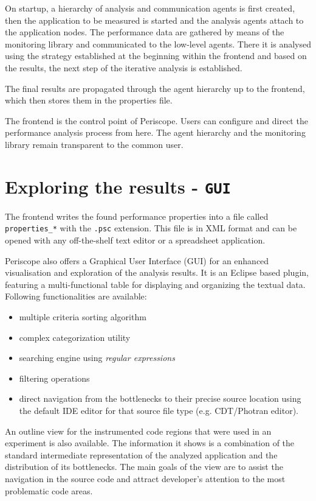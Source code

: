 \documentclass[11pt,oneside,a4paper]{book}
\begin{document}
On startup, a hierarchy of analysis and communication agents is first created, then the application to be measured is started and the analysis agents attach to the application nodes. The performance data are gathered by means of the monitoring library and communicated to the low-level agents. There it is analysed using the strategy established at the beginning within the frontend and based on the results, the next step of the iterative analysis is established.

The final results are propagated through the agent hierarchy up to the frontend, which then stores them in the properties file.

The frontend is the control point of Periscope. Users can configure and direct the performance analysis process from here. The agent hierarchy and the monitoring library remain transparent to the common user.


\section{Exploring the results - \texttt{GUI}}\label{sec:GUI}

The frontend writes the found performance properties into a file called \texttt{properties\_*} with the \texttt{.psc} extension. This file is in XML format and can be opened with any off-the-shelf text editor or a spreadsheet application.

Periscope also offers a Graphical User Interface (GUI) for an enhanced visualisation and exploration of the analysis results. It is an Eclipse based plugin, featuring a multi-functional table for displaying and organizing the textual data. Following functionalities are available:
\begin{itemize}
\item multiple criteria sorting algorithm
\item complex categorization utility
\item searching engine using \textit{regular expressions}
\item filtering operations
\item direct navigation from the bottlenecks to their precise source location using the default IDE editor for that source file type (e.g. CDT/Photran editor).
\end{itemize}

An outline view for the instrumented code regions that were used in an experiment is also available. The information it shows is a combination of the standard intermediate representation of the analyzed application and the distribution of its bottlenecks. The main goals of the view are to assist the navigation in the source code and attract developer's attention to the most problematic code areas.
\end{document}
